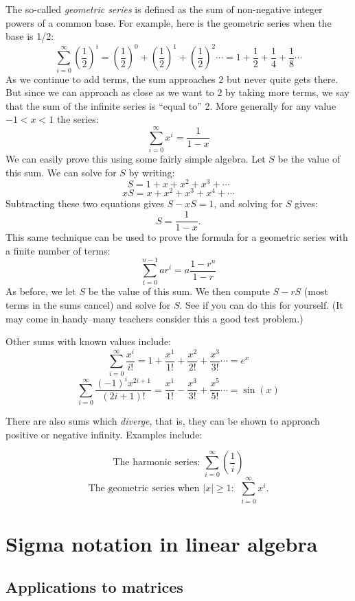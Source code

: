 The so-called \emph{geometric series} is defined as the sum of non-negative integer powers of a common base.  For example, here is the geometric series when the base is 1/2:
\[\sum_{i=0}^{\infty}\left({\dfrac{1}{2}}\right)^i=\left({\dfrac{1}{2}}\right)^0+\left({\dfrac{1}{2}}\right)^1+\left({\dfrac{1}{2}}\right)^2\cdots = 1 + {\dfrac{1}{2}} + {\dfrac{1}{4}} + {\dfrac{1}{8}}\cdots\]
As we continue to add  terms,  the sum approaches $2$ but never quite gets there. But since we can approach as close as we want to 2 by taking more terms, we say that the sum of the infinite series is ``equal to'' 2. 
More generally for any value $-1<x<1$ the series:
\[\sum_{i=0}^{\infty}x^i = \dfrac{1}{1-x}\]
We can easily prove this using some fairly simple algebra.  Let $S$ be the value of this sum.  We can solve for $S$  by writing:
 \[S=1+x+x^2+x^3+ \cdots \]
\[xS=x+x^2+x^3+x^4+ \cdots \] 
Subtracting these two equations gives $S-xS=1$, and solving for $S$ gives:
\[S=\dfrac{1}{1-x}. \]
This same technique can be used to prove the formula for a geometric series with a finite number of terms:
\[ \sum_{i=0}^{n-1} ar^i = a \dfrac{1-r^n}{1-r} \]
As before, we let $S$ be the value of this sum. We then compute $S - rS$ (most terms in the sums cancel) and solve for $S$.  See if you can do this for yourself.  (It may come in handy--many teachers consider this a good test problem.)

Other sums with known values include:
\[\sum_{i=0}^{\infty}\dfrac{x^i}{i!} =1+\dfrac{x^1}{1!}+\dfrac{x^2}{2!}+\dfrac{x^3}{3!} \cdots=e^x\]
\[\sum_{i=0}^{\infty}\dfrac{(-1)^i x^{2i+1}}{(2i+1)!} = \dfrac{x^1}{1!}-\dfrac{x^3}{3!}+\dfrac{x^5}{5!}\cdots= \sin(x)\]

There are also sums which \emph{diverge}, that is, they can be shown to approach positive or negative infinity. Examples include:

\[\text{The harmonic series:  }\sum_{i=0}^{\infty}\left(\dfrac{1}{i} \right) \]
\[\text{The geometric series when~} |x| \ge 1: ~~\sum_{i=0}^{\infty} x^i. \]

\section{Sigma notation in linear algebra\quad
{}}

\subsection{Applications to matrices}

